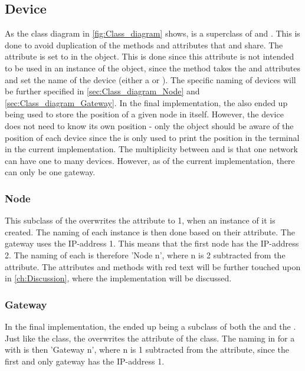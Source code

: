 \subsection{Device}
As the class diagram in \autoref{fig:Class_diagram} shows,  is a superclass of  and . This is done to avoid duplication of the methods and attributes that  and  share. The attribute  is set to  in the  object. This is done since this attribute is not intended to be used in an instance of the  object, since the  method takes the  and  attributes and set the name of the device (either a  or ). The specific naming of devices will be further specified in \autoref{sec:Class_diagram_Node} and \autoref{sec:Class_diagram_Gateway}. In the final implementation, the  also ended up being used to store the position of a given node in itself. However, the device does not need to know its own position - only the  object should be aware of the position of each device since the  is only used to print the position in the terminal in the current implementation. The multiplicity between  and  is that one network can have one to many devices. However, as of the current implementation, there can only be one gateway.

\subsubsection{Node}\label{sec:Class_diagram_Node}
This subclass of the  overwrites the  attribute to 1, when an instance of it is created. The naming of each  instance is then done based on their  attribute. The gateway uses the IP-address 1. This means that the first node has the IP-address 2. The naming of each  is therefore 'Node n', where n is 2 subtracted from the  attribute. The attributes and methods with red text will be further touched upon in \autoref{ch:Discussion}, where the implementation will be discussed.

\subsubsection{Gateway}\label{sec:Class_diagram_Gateway}
In the final implementation, the  ended up being a subclass of both the  and the . Just like the  class, the  overwrites the  attribute of the  class. The naming in  for a  with  is then 'Gateway n', where n is 1 subtracted from the  attribute, since the first and only gateway has the IP-address 1.

